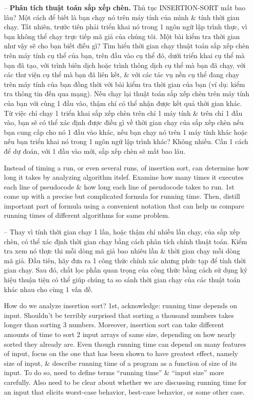 \documentclass{article}
\begin{document}
\begin{itemize}
\begin{itemize}
\begin{itemize}
            -- {\bf Phân tích thuật toán sắp xếp chèn.} Thủ tục INSERTION-SORT mất bao lâu? Một cách để biết là bạn chạy nó trên máy tính của mình \& tính thời gian chạy. Tất nhiên, trước tiên phải triển khai nó trong 1 ngôn ngữ lập trình thực, vì bạn không thể chạy trực tiếp mã giả của chúng tôi. Một bài kiểm tra thời gian như vậy sẽ cho bạn biết điều gì? Tìm hiểu thời gian chạy thuật toán sắp xếp chèn trên máy tính cụ thể của bạn, trên đầu vào cụ thể đó, dưới triển khai cụ thể mà bạn đã tạo, với trình biên dịch hoặc trình thông dịch cụ thể mà bạn đã chạy, với các thư viện cụ thể mà bạn đã liên kết, \& với các tác vụ nền cụ thể đang chạy trên máy tính của bạn đồng thời với bài kiểm tra thời gian của bạn (ví dụ: kiểm tra thông tin đến qua mạng). Nếu chạy lại thuật toán sắp xếp chèn trên máy tính của bạn với cùng 1 đầu vào, thậm chí có thể nhận được kết quả thời gian khác. Từ việc chỉ chạy 1 triển khai sắp xếp chèn trên chỉ 1 máy tính \& trên chỉ 1 đầu vào, bạn sẽ có thể xác định được điều gì về thời gian chạy của sắp xếp chèn nếu bạn cung cấp cho nó 1 đầu vào khác, nếu bạn chạy nó trên 1 máy tính khác hoặc nếu bạn triển khai nó trong 1 ngôn ngữ lập trình khác? Không nhiều. Cần 1 cách để dự đoán, với 1 đầu vào mới, sắp xếp chèn sẽ mất bao lâu.
            
            Instead of timing a run, or even several runs, of insertion sort, can determine how long it takes by analyzing algorithm itslef. Examine how many times it executes each line of pseudocode \& how long each line of pseudocode takes to run. 1st come up with a precise but complicated formula for running time. Then, distill important part of formula using a convenient notation that can help us compare running times of different algorithms for same problem.
            
            -- Thay vì tính thời gian chạy 1 lần, hoặc thậm chí nhiều lần chạy, của sắp xếp chèn, có thể xác định thời gian chạy bằng cách phân tích chính thuật toán. Kiểm tra xem nó thực thi mỗi dòng mã giả bao nhiêu lần \& thời gian chạy mỗi dòng mã giả. Đầu tiên, hãy đưa ra 1 công thức chính xác nhưng phức tạp để tính thời gian chạy. Sau đó, chắt lọc phần quan trọng của công thức bằng cách sử dụng ký hiệu thuận tiện có thể giúp chúng ta so sánh thời gian chạy của các thuật toán khác nhau cho cùng 1 vấn đề.
            
            How do we analyze insertion sort? 1st, acknowledge: running time depends on input. Shouldn't be terribly surprised that sorting a thousand numbers takes longer than sorting 3 numbers. Moreover, insertion sort can take different amounts of time to sort 2 input arrays of same size, depending on how nearly sorted they already are. Even though running time can depend on many features of input, focus on the one that has been shown to have greatest effect, namely size of input, \& describe running time of a program as a function of size of its input. To do so, need to define terms ``running time'' \& ``input size'' more carefully. Also need to be clear about whether we are discussing running time for an input that elicits worst-case behavior, best-case behavior, or some other case.
            

\end{itemize}
\end{itemize}
\end{itemize}
\end{document}
